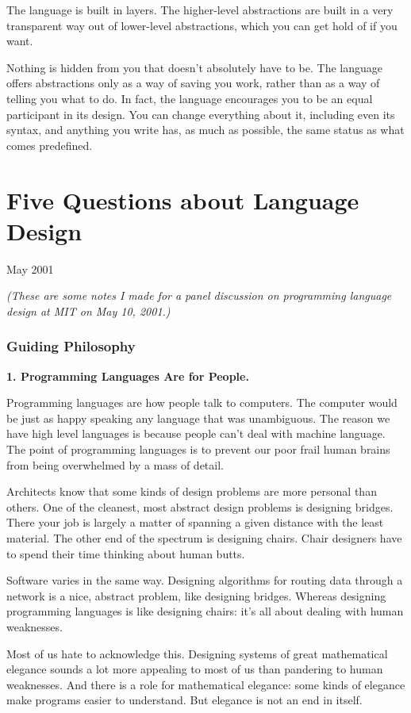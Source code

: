 \documentclass[12pt]{book}
\begin{document}
The language is built in layers. The higher-level abstractions are built
in a very transparent way out of lower-level abstractions, which you can
get hold of if you want.

Nothing is hidden from you that doesn't absolutely have to be. The
language offers abstractions only as a way of saving you work, rather
than as a way of telling you what to do. In fact, the language
encourages you to be an equal participant in its design. You can change
everything about it, including even its syntax, and anything you write
has, as much as possible, the same status as what comes predefined.
\chapter{Five Questions about Language Design}

May 2001

\emph{(These are some notes I made for a panel discussion on programming
language design at MIT on May 10, 2001.)}

\subsection{Guiding Philosophy}\label{guiding-philosophy}

\textbf{1. Programming Languages Are for People.}

Programming languages are how people talk to computers. The computer
would be just as happy speaking any language that was unambiguous. The
reason we have high level languages is because people can't deal with
machine language. The point of programming languages is to prevent our
poor frail human brains from being overwhelmed by a mass of detail.

Architects know that some kinds of design problems are more personal
than others. One of the cleanest, most abstract design problems is
designing bridges. There your job is largely a matter of spanning a
given distance with the least material. The other end of the spectrum is
designing chairs. Chair designers have to spend their time thinking
about human butts.

Software varies in the same way. Designing algorithms for routing data
through a network is a nice, abstract problem, like designing bridges.
Whereas designing programming languages is like designing chairs: it's
all about dealing with human weaknesses.

Most of us hate to acknowledge this. Designing systems of great
mathematical elegance sounds a lot more appealing to most of us than
pandering to human weaknesses. And there is a role for mathematical
elegance: some kinds of elegance make programs easier to understand. But
elegance is not an end in itself.
\end{document}

